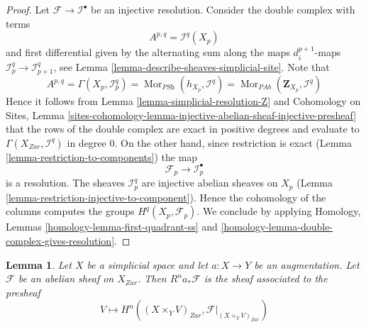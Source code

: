 \documentclass{stacks-project}
\theoremstyle{plain}
\newtheorem{lemma}[subsection]{Lemma}
\theoremstyle{definition}
\theoremstyle{remark}
\numberwithin{equation}{subsection}
\def\Mor{\mathop{\mathrm{Mor}}\nolimits}
\begin{document}
\begin{proof}
Let $\mathcal{F} \to \mathcal{I}^\bullet$ be an injective resolution.
Consider the double complex with terms
$$
A^{p, q} = \mathcal{I}^q(X_p)
$$
and first differential given by the alternating sum along the maps
$d^{p + 1}_i$-maps $\mathcal{I}_p^q \to \mathcal{I}_{p + 1}^q$, see
Lemma \ref{lemma-describe-sheaves-simplicial-site}. Note that
$$
A^{p, q} = \Gamma(X_p, \mathcal{I}_p^q) =
\Mor_{\textit{PSh}}(h_{X_p}, \mathcal{I}^q) =
\Mor_{\textit{PAb}}(\mathbf{Z}_{X_p}, \mathcal{I}^q)
$$
Hence it follows from Lemma \ref{lemma-simplicial-resolution-Z} and
Cohomology on Sites, Lemma
\ref{sites-cohomology-lemma-injective-abelian-sheaf-injective-presheaf}
that the rows of the double complex are exact in positive degrees and
evaluate to $\Gamma(X_{Zar}, \mathcal{I}^q)$ in degree $0$.
On the other hand, since restriction is exact
(Lemma \ref{lemma-restriction-to-components})
the map
$$
\mathcal{F}_p \to \mathcal{I}_p^\bullet
$$
is a resolution. The sheaves $\mathcal{I}_p^q$ are injective
abelian sheaves on $X_p$
(Lemma \ref{lemma-restriction-injective-to-component}).
Hence the cohomology of the columns computes the groups
$H^q(X_p, \mathcal{F}_p)$. We conclude by applying
Homology, Lemmas \ref{homology-lemma-first-quadrant-ss} and
\ref{homology-lemma-double-complex-gives-resolution}.
\end{proof}

\begin{lemma}
\label{lemma-augmentation-pushforward-higher-direct-image}
Let $X$ be a simplicial space and let $a : X \to Y$
be an augmentation. Let $\mathcal{F}$ be an abelian sheaf
on $X_{Zar}$. Then $R^na_*\mathcal{F}$ is the sheaf associated
to the presheaf
$$
V \longmapsto H^n((X \times_Y V)_{Zar}, \mathcal{F}|_{(X \times_Y V)_{Zar}})
$$
\end{lemma}
\end{document}
